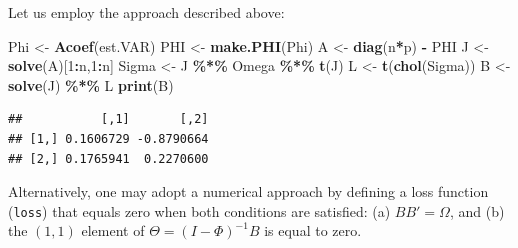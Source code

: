 \documentclass[
  11pt,
]{book}
\newenvironment{Shaded}{\begin{snugshade}}{\end{snugshade}}
\newcommand{\DecValTok}[1]{\textcolor[rgb]{0.00,0.00,0.81}{#1}}
\newcommand{\FunctionTok}[1]{\textcolor[rgb]{0.13,0.29,0.53}{\textbf{#1}}}
\newcommand{\NormalTok}[1]{#1}
\newcommand{\OtherTok}[1]{\textcolor[rgb]{0.56,0.35,0.01}{#1}}
\newcommand{\SpecialCharTok}[1]{\textcolor[rgb]{0.81,0.36,0.00}{\textbf{#1}}}
\theoremstyle{definition}
\theoremstyle{definition}
\theoremstyle{definition}
\theoremstyle{definition}
\theoremstyle{remark}
\begin{document}
Let us employ the approach described above:

\begin{Shaded}
\begin{Highlighting}[]
\NormalTok{Phi }\OtherTok{\textless{}{-}} \FunctionTok{Acoef}\NormalTok{(est.VAR)}
\NormalTok{PHI }\OtherTok{\textless{}{-}} \FunctionTok{make.PHI}\NormalTok{(Phi)}
\NormalTok{A }\OtherTok{\textless{}{-}} \FunctionTok{diag}\NormalTok{(n}\SpecialCharTok{*}\NormalTok{p) }\SpecialCharTok{{-}}\NormalTok{ PHI}
\NormalTok{J }\OtherTok{\textless{}{-}} \FunctionTok{solve}\NormalTok{(A)[}\DecValTok{1}\SpecialCharTok{:}\NormalTok{n,}\DecValTok{1}\SpecialCharTok{:}\NormalTok{n]}
\NormalTok{Sigma }\OtherTok{\textless{}{-}}\NormalTok{ J }\SpecialCharTok{\%*\%}\NormalTok{ Omega }\SpecialCharTok{\%*\%} \FunctionTok{t}\NormalTok{(J)}
\NormalTok{L }\OtherTok{\textless{}{-}} \FunctionTok{t}\NormalTok{(}\FunctionTok{chol}\NormalTok{(Sigma))}
\NormalTok{B }\OtherTok{\textless{}{-}} \FunctionTok{solve}\NormalTok{(J) }\SpecialCharTok{\%*\%}\NormalTok{ L}
\FunctionTok{print}\NormalTok{(B)}
\end{Highlighting}
\end{Shaded}

\begin{verbatim}
##           [,1]       [,2]
## [1,] 0.1606729 -0.8790664
## [2,] 0.1765941  0.2270600
\end{verbatim}

Alternatively, one may adopt a numerical approach by defining a loss function (\texttt{loss}) that equals zero when both conditions are satisfied: (a) \(BB' = \Omega\), and (b) the \((1,1)\) element of \(\Theta = (I - \Phi)^{-1}B\) is equal to zero.
\end{document}
